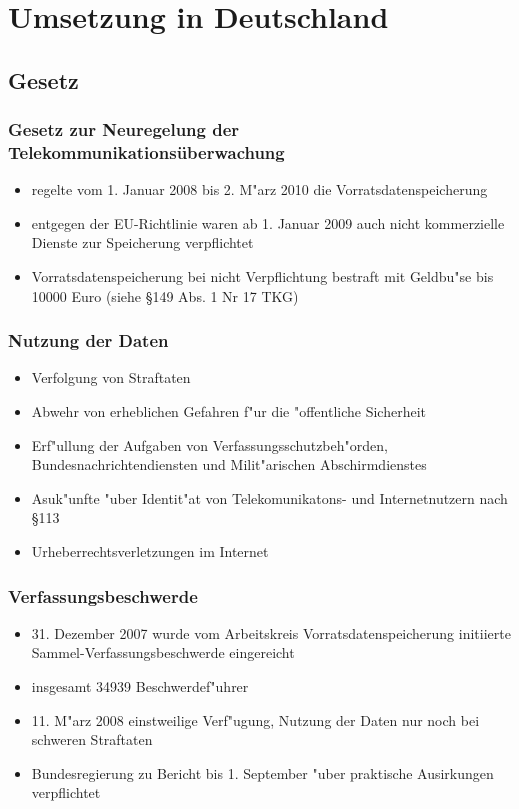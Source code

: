 
\section{Umsetzung in Deutschland}
  \subsection{Gesetz}
  \begin{frame}
  \frametitle{Gesetz zur Neuregelung der Telekommunikationsüberwachung}
    \begin{itemize}
      \item 
        regelte vom 1. Januar 2008 bis 2. M"arz 2010 die Vorratsdatenspeicherung
      \item 
        entgegen der EU-Richtlinie waren ab 1. Januar 2009 auch nicht kommerzielle Dienste zur Speicherung verpflichtet
      \item 
        Vorratsdatenspeicherung bei nicht Verpflichtung bestraft mit Geldbu"se bis 10000 Euro (siehe \S 149 Abs. 1 Nr 17 TKG)
    \end{itemize}
  \end{frame}

  \begin{frame}
    \frametitle{Nutzung der Daten}
    \begin{itemize}
      \item Verfolgung von Straftaten
      \item Abwehr von erheblichen Gefahren f"ur die "offentliche Sicherheit
      \item Erf"ullung der Aufgaben von Verfassungsschutzbeh"orden, Bundesnachrichtendiensten und Milit"arischen Abschirmdienstes
      \item Asuk"unfte "uber Identit"at von Telekomunikatons- und Internetnutzern nach \S 113
      \item Urheberrechtsverletzungen im Internet
    \end{itemize}
  \end{frame}

  \begin{frame}
    \frametitle{Verfassungsbeschwerde}
    \begin{itemize}
      \item 31. Dezember 2007 wurde vom Arbeitskreis Vorratsdatenspeicherung initiierte Sammel-Verfassungsbeschwerde eingereicht
      \item insgesamt 34939 Beschwerdef"uhrer
      \item 11. M"arz 2008 einstweilige Verf"ugung, Nutzung der Daten nur noch bei schweren Straftaten
      \item Bundesregierung zu Bericht bis 1. September "uber praktische Ausirkungen verpflichtet
    \end{itemize}
  \end{frame}


